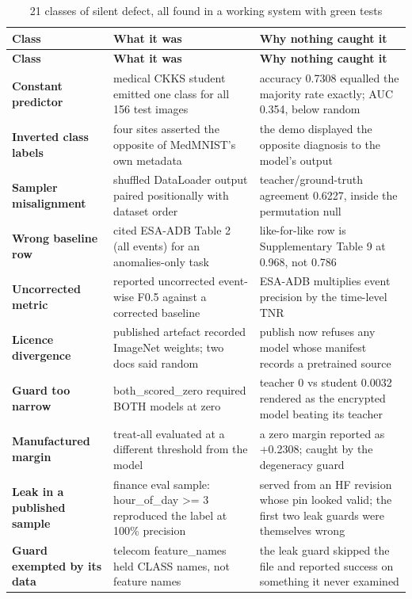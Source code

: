 {\scriptsize
\begin{longtable}{>{\raggedright\arraybackslash}p{2.5cm}>{\raggedright\arraybackslash}p{5.2cm}>{\raggedright\arraybackslash}p{6.2cm}}
\caption{21 classes of silent defect, all found in a working system with green tests}\\
\toprule
\textbf{Class} & \textbf{What it was} & \textbf{Why nothing caught it} \\
\midrule
\endfirsthead
\toprule
\textbf{Class} & \textbf{What it was} & \textbf{Why nothing caught it} \\
\midrule
\endhead
\textbf{Constant predictor} & medical CKKS student emitted one class for all 156 test images & accuracy 0.7308 equalled the majority rate exactly; AUC 0.354, below random \\
\textbf{Inverted class labels} & four sites asserted the opposite of MedMNIST's own metadata & the demo displayed the opposite diagnosis to the model's output \\
\textbf{Sampler misalignment} & shuffled DataLoader output paired positionally with dataset order & teacher/ground-truth agreement 0.6227, inside the permutation null \\
\textbf{Wrong baseline row} & cited ESA-ADB Table 2 (all events) for an anomalies-only task & like-for-like row is Supplementary Table 9 at 0.968, not 0.786 \\
\textbf{Uncorrected metric} & reported uncorrected event-wise F0.5 against a corrected baseline & ESA-ADB multiplies event precision by the time-level TNR \\
\textbf{Licence divergence} & published artefact recorded ImageNet weights; two docs said random & publish now refuses any model whose manifest records a pretrained source \\
\textbf{Guard too narrow} & both\_scored\_zero required BOTH models at zero & teacher 0 vs student 0.0032 rendered as the encrypted model beating its teacher \\
\textbf{Manufactured margin} & treat-all evaluated at a different threshold from the model & a zero margin reported as +0.2308; caught by the degeneracy guard \\
\textbf{Leak in a published sample} & finance eval sample: hour\_of\_day >= 3 reproduced the label at 100\% precision & served from an HF revision whose pin looked valid; the first two leak guards were themselves wrong \\
\textbf{Guard exempted by its data} & telecom feature\_names held CLASS names, not feature names & the leak guard skipped the file and reported success on something it never examined \\

\end{longtable}}
